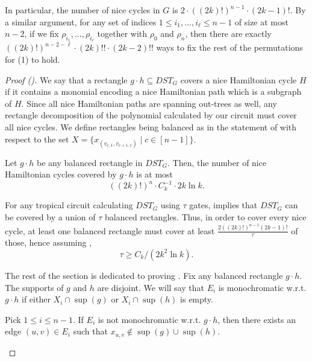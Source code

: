     In particular, the number of nice cycles in $G$ is $2 \cdot ((2k)!)^{n-1} \cdot (2k - 1)!$. By a similar argument, for any set of indices $1 \leq i_1, \dots, i_\ell \leq n - 1$ of size at most $n - 2$, if we fix $\rho_{i_1}, \dots, \rho_{i_\ell}$ together with $\rho_0$ and $\rho_n$, then there are exactly
    $
        ((2k)!)^{n - 2 - \ell} \cdot (2k)!! \cdot (2k - 2)!!
    $
    ways to fix the rest of the permutations for (1) to hold.
    \newline




\begin{proof}[Proof ()]

    We say that a rectangle $g \cdot h \subseteq DST_G$ covers a nice Hamiltonian cycle $H$ if it contains a monomial encoding a nice Hamiltonian path which is a subgraph of $H$. Since all nice Hamiltonian paths are spanning out-trees as well, any rectangle decomposition of the polynomial calculated by our circuit must cover all nice cycles. We define rectangles being balanced as in the statement of  with respect to the set $X = \{ x_{(v_{c, 1}, v_{c + 1, 1})} \mid c \in [n - 1] \}$.
    
    \begin{claim}\label{clm:dst_rect_bound}
        Let $g \cdot h$ be any balanced rectangle in $DST_G$. Then, the number of nice Hamiltonian cycles covered by $g \cdot h$ is at most
        $$
            ((2k)!)^n \cdot C_k^{-1} \cdot 2k \ln k.
        $$
    \end{claim}

    For any tropical circuit calculating $DST_G$ using $\tau$ gates,  implies that $DST_G$ can be covered by a union of $\tau$ balanced rectangles. Thus, in order to cover every nice cycle, at least one balanced rectangle must cover at least $\frac{2 ((2k)!)^{n - 1} (2k - 1)!}{\tau}$ of those, hence assuming ,
    $$
        \tau \geq C_k / (2k^2 \ln k).
    $$    
    
    The rest of the section is dedicated to proving .
    Fix any balanced rectangle $g \cdot h$. The supports of $g$ and $h$ are disjoint. We will say that $E_i$ is monochromatic w.r.t. $g \cdot h$ if either $X_i \cap \sup(g)$ or $X_i \cap \sup(h)$ is empty.

    \begin{claim}\label{clm:dst_rect_colorful}
        Pick $1 \leq i \leq n - 1$. If $E_i$ is not monochromatic w.r.t. $g \cdot h$, then there exists an edge $(u, v) \in E_i$ such that $x_{u, v} \not\in \sup(g) \cup \sup(h)$.
    \end{claim}


\end{proof}
